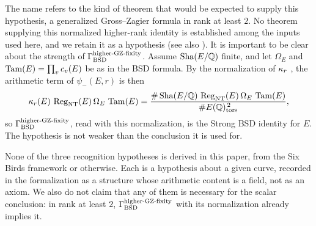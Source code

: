 The name refers to the kind of theorem that would be expected to supply
this hypothesis, a generalized Gross--Zagier formula in rank at least
$2$.  No theorem supplying this normalized higher-rank identity is
established among the inputs used here, and we retain it as a hypothesis
(see also ).  It is
important to be clear about the strength of $\Gamma_{\mathrm{BSD}}^{\mathrm{higher\text{-}GZ\text{-}fixity}}$.  Assume
$\operatorname{Sha}(E/\mathbb{Q})$ finite, and let $\Omega_E$ and $\operatorname{Tam}(E)=\prod_vc_v(E)$ be as
in the BSD formula.  By the normalization of $\kappa_r$
\citep[Section~13]{TsiokosBSDApparatus2026}, the arithmetic term of
$\psi_-(E,r)$ is then
\[
  \kappa_r(E)\,\operatorname{Reg}_{\mathrm{NT}}(E)\,\Omega_E\,\operatorname{Tam}(E)
  =
  \frac{\#\operatorname{Sha}(E/\mathbb{Q})\,\operatorname{Reg}_{\mathrm{NT}}(E)\,\Omega_E\,\operatorname{Tam}(E)}
       {\#E(\mathbb{Q})_{\operatorname{tors}}^{\,2}},
\]
so $\Gamma_{\mathrm{BSD}}^{\mathrm{higher\text{-}GZ\text{-}fixity}}$, read with this normalization, is the Strong BSD identity for
$E$.  The hypothesis is not weaker than the conclusion it is used for.

\begin{nonclaim}\label{nonclaim:closure:recognition-sources-not-derived}
None of the three recognition hypotheses is derived in this paper, from
the Six Birds framework or otherwise.  Each is a hypothesis about a given
curve, recorded in the formalization as a structure whose arithmetic
content is a field, not as an axiom.  We also do not claim that any of
them is necessary for the scalar conclusion: in rank at least $2$,
$\Gamma_{\mathrm{BSD}}^{\mathrm{higher\text{-}GZ\text{-}fixity}}$ with its normalization already implies it.
\end{nonclaim}
